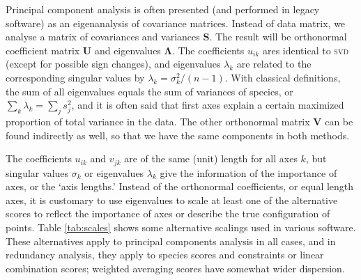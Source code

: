 \documentclass[a4paper,10pt]{amsart}
\begin{document}
Principal component analysis is often presented (and performed in
legacy software) as an eigenanalysis of covariance matrices.  Instead
of data matrix, we analyse a matrix of covariances and variances
$\mathbf{S}$.  The result will be orthonormal coefficient matrix
$\mathbf{U}$ and eigenvalues $\mathbf{\Lambda}$.  The coefficients
$u_{ik}$ ares identical to \textsc{svd} (except for possible sign
changes), and eigenvalues $\lambda_k$ are related to the corresponding
singular values by $\lambda_k = \sigma_k^2 /(n-1)$.  With classical
definitions, the sum of all eigenvalues equals the sum of variances of
species, or $\sum_k \lambda_k = \sum_j s_j^2$, and it is often said
that first axes explain a certain maximized proportion of total
variance in the data.  The other orthonormal matrix $\mathbf{V}$ can
be found indirectly as well, so that we have the same components in
both methods.

The coefficients $u_{ik}$ and $v_{jk}$ are of the same (unit) length
for all axes $k$, but singular values $\sigma_k$ or eigenvalues
$\lambda_k$ give the information of the importance of axes, or the
`axis lengths.'  Instead of the orthonormal coefficients, or equal
length axes, it is customary to use eigenvalues to scale at least one
of the alternative scores to reflect the importance of axes or
describe the true configuration of points.  Table \ref{tab:scales}
shows some alternative scalings used in various software.  These
alternatives apply to principal components analysis in all cases, and
in redundancy analysis, they apply to species scores and constraints or
linear combination scores; weighted averaging scores have somewhat
wider dispersion.
\end{document}
